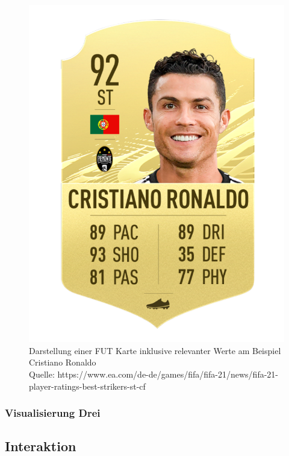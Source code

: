 \documentclass[usegeometry=true]{scrartcl}
\begin{document}
\begin{figure}[h]
\includegraphics[scale=0.25]{grafiken/Ronaldo}
\caption{Darstellung einer FUT Karte inklusive relevanter Werte am Beispiel Cristiano Ronaldo\\ Quelle: https://www.ea.com/de-de/games/fifa/fifa-21/news/fifa-21-player-ratings-best-strikers-st-cf}
\end{figure}


\subsubsection{Visualisierung Drei}

\subsection{Interaktion}
\end{document}
